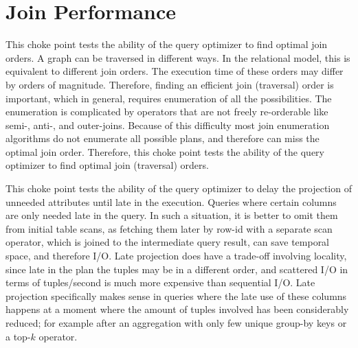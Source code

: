 


\section{Join Performance}



This choke point tests the ability of the query optimizer to find optimal join orders. A graph can be traversed in different ways. In the relational model, this is equivalent to different join orders.
The execution time of these orders may differ by orders of magnitude. Therefore, finding an efficient join (traversal) order is important, which in general, requires enumeration of all the possibilities.
The enumeration is complicated by operators that are not freely re-orderable like semi-, \mbox{anti-,} and outer-joins. Because of this difficulty most join enumeration algorithms do not enumerate all possible plans, and therefore can miss the optimal join order. Therefore, this choke point tests the ability of the query optimizer to find optimal join (traversal) orders.





This choke point tests the ability of the query optimizer to delay the projection of unneeded attributes until late in the execution. Queries where certain columns are only needed late in the query.
In such a situation, it is better to omit them from initial table scans, as fetching them later by row-id with a separate scan operator, which is joined to the intermediate query result, can save temporal space, and therefore I/O.
Late projection does have a trade-off involving locality, since late in the plan the tuples may be in a different order, and scattered I/O in terms of tuples/second is much more expensive than sequential I/O.
Late projection specifically makes sense in queries where the late use of these columns happens at a moment where the amount of tuples involved has been considerably reduced;
for example after an aggregation with only few unique group-by keys or a top-$k$ operator.

